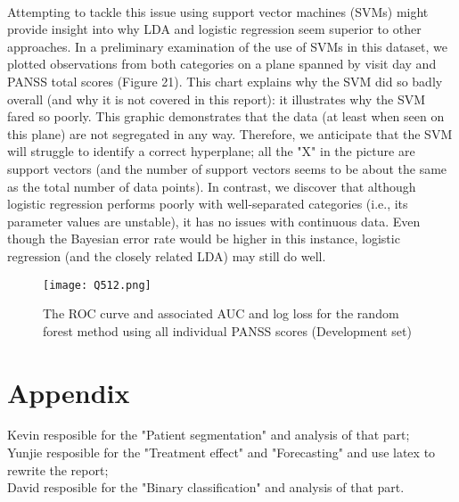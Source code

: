 \documentclass{article}
\begin{document}
	\paragraph{}Attempting to tackle this issue using support vector machines (SVMs) might provide insight into why LDA and logistic regression seem superior to other approaches. In a preliminary examination of the use of SVMs in this dataset, we plotted observations from both categories on a plane spanned by visit day and PANSS total scores (Figure 21). This chart explains why the SVM did so badly overall (and why it is not covered in this report): it illustrates why the SVM fared so poorly. This graphic demonstrates that the data (at least when seen on this plane) are not segregated in any way. Therefore, we anticipate that the SVM will struggle to identify a correct hyperplane; all the "X" in the picture are support vectors (and the number of support vectors seems to be about the same as the total number of data points). In contrast, we discover that although logistic regression performs poorly with well-separated categories (i.e., its parameter values are unstable), it has no issues with continuous data. Even though the Bayesian error rate would be higher in this instance, logistic regression (and the closely related LDA) may still do well.

\begin{figure}[H] 
\centering %
\texttt{[image: Q512.png]} 
\caption{The ROC curve and associated AUC and log loss for the random forest method using all individual PANSS scores (Development set)}
\label{R} %
\end{figure}

  \section{Appendix}
Kevin resposible for the "Patient segmentation" and analysis of that part;\\
Yunjie resposible for the "Treatment effect" and "Forecasting" and use latex to rewrite the report;\\
David resposible for the "Binary classification" and analysis of that part.\\
\end{document}
